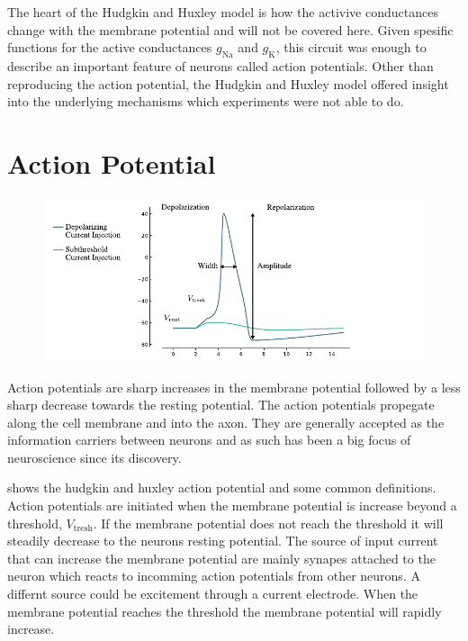 \documentclass[altfont, fleqn]{uiophd}
\renewcommand{\Cref}[1]{{\color{viridis_03}\myCref{#1}}}
\begin{document}
The heart of the Hudgkin and Huxley model is 
how the activive conductances change with the membrane potential
and will not be covered here. 
Given spesific functions for the active conductances $g_\text{Na}$
and $g_\text{K}$, this circuit was enough to describe an important feature
of neurons called action potentials.
Other than reproducing the action potential, 
the Hudgkin and Huxley model offered insight
into the underlying mechanisms 
which experiments were not able to do.

\section{Action Potential}
\begin{figure}[h]
    \centering
    \includegraphics[width=\textwidth]{images/sec_2/action_potential.pdf}
    \caption{
    }
    \label{fig:2_action_potential_anatomy}
\end{figure}

Action potentials are sharp increases in the membrane potential
followed by a less sharp decrease towards the resting potential. 
The action potentials propegate along the cell membrane and into
the axon. 
They are generally accepted as the information carriers between neurons
and as such has been a big focus of neuroscience since its discovery.

\Cref{fig:2_action_potential_anatomy} shows the hudgkin and huxley
action potential
and some common definitions. 
Action potentials are initiated when the membrane potential is increase
beyond a threshold, $V_\text{tresh}$. 
If the membrane potential does not reach the threshold it will steadily 
decrease to the neurons resting potential. 
The source of input current that can increase the membrane potential
are mainly synapes attached to the neuron which reacts to incomming
action potentials from other neurons. 
A differnt source could be excitement through a current electrode. 
When the membrane potential reaches the threshold the membrane
potential will rapidly increase. 
\end{document}
